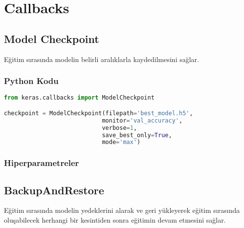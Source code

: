 \section{Callbacks}

\subsection{Model Checkpoint}
Eğitim sırasında modelin belirli aralıklarla kaydedilmesini sağlar.

\subsubsection{Python Kodu}

\begin{lstlisting}[language=Python]
from keras.callbacks import ModelCheckpoint

checkpoint = ModelCheckpoint(filepath='best_model.h5',
							monitor='val_accuracy',
							verbose=1,
							save_best_only=True,
							mode='max')
\end{lstlisting}

\subsubsection{Hiperparametreler}
\begin{table}[h]
\centering
{\scriptsize\renewcommand{\arraystretch}{0.4}
{}}
\end{table}

\newpage

\subsection{BackupAndRestore}
Eğitim sırasında modelin yedeklerini alarak ve geri yükleyerek eğitim sırasında oluşabilecek herhangi bir kesintiden sonra eğitimin devam etmesini sağlar.

